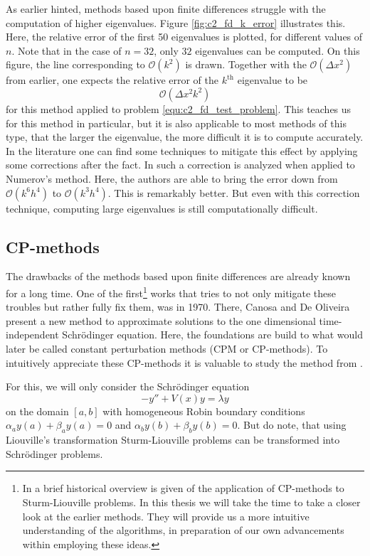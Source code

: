 As earlier hinted, methods based upon finite differences struggle with the computation of higher eigenvalues. Figure \ref{fig:c2_fd_k_error} illustrates this. Here, the relative error of the first 50 eigenvalues is plotted, for different values of $n$. Note that in the case of $n = 32$, only $32$ eigenvalues can be computed. On this figure, the line corresponding to $\mathcal{O}(k^2)$ is drawn. Together with the $\mathcal{O}(\Delta x^2)$ from earlier, one expects the relative error of the $k^\text{th}$ eigenvalue to be
$$
    \mathcal{O}(\Delta x^2 k^2)
$$
for this method applied to problem \eqref{equ:c2_fd_test_problem}. This teaches us for this method in particular, but it is also applicable to most methods of this type, that the larger the eigenvalue, the more difficult it is to compute accurately. In the literature one can find some techniques to mitigate this effect by applying some corrections after the fact. In \cite{andrew_correction_1985} such a correction is analyzed when applied to Numerov's method. Here, the authors are able to bring the error down from $\mathcal{O}(k^6 h^4)$ to $\mathcal{O}(k^3 h^4)$. This is remarkably better. But even with this correction technique, computing large eigenvalues is still computationally difficult.

\subsection{CP-methods}

The drawbacks of the methods based upon finite differences are already known for a long time. One of the first\footnote{In \cite{ledoux_solving_2010} a brief historical overview is given of the application of CP-methods to Sturm-Liouville problems. In this thesis we will take the time to take a closer look at the earlier methods. They will provide us a more intuitive understanding of the algorithms, in preparation of our own advancements within employing these ideas.} works that tries to not only mitigate these troubles but rather fully fix them, was \cite{canosa_new_1970} in 1970. There, Canosa and De Oliveira present a new method to approximate solutions to the one dimensional time-independent Schrödinger equation. Here, the foundations are build to what would later be called constant perturbation methods (CPM or CP-methods). To intuitively appreciate these CP-methods it is valuable to study the method from \cite{canosa_new_1970}.

For this, we will only consider the Schrödinger equation
\begin{equation}\label{equ:c2_cpm_schrodinger}
    - y'' + V(x) y = \lambda y
\end{equation}
on the domain $[a, b]$ with homogeneous Robin boundary conditions $\alpha_a y(a) + \beta_a y(a) = 0$ and $\alpha_b y(b) + \beta_b y(b) = 0$. But do note, that using Liouville's transformation Sturm-Liouville problems can be transformed into Schrödinger problems.

